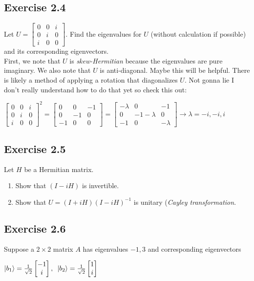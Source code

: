 \documentclass[12pt]{article}
\theoremstyle{plain}
\theoremstyle{nonumberplain}
\theoremstyle{plain}
\theoremstyle{nonumberplain}
\newcommand\1{{\bf 1}}
\newcommand{\bmat}[1]{\begin{bmatrix*} #1 \end{bmatrix*}} %
\newcommand{\<}{\left\langle}
\renewcommand{\>}{\right\rangle}
\begin{document}
\subsection{Exercise 2.4}
Let $U=\bmat{0 & 0 & i \\ 0 & i & 0 \\ i & 0 & 0}$. Find the eigenvalues for $U$ (without calculation if possible) and its corresponding eigenvectors. \\
First, we note that $U$ is \textit{skew-Hermitian} because the eigenvalues are pure imaginary. We also note that $U$ is anti-diagonal. Maybe this will be helpful. There is likely a method of applying a rotation that diagonalizes $U$. Not gonna lie I don't really understand how to do that yet so check this out:
\begin{center}
$\bmat{0 & 0 & i \\ 0 & i & 0 \\ i & 0 & 0}^2=\bmat{0 & 0 & -1 \\ 0 & -1 & 0 \\ -1 & 0 & 0}=
\bmat{-\lambda & 0 & -1 \\ 0 & -1-\lambda & 0 \\ -1 & 0 & -\lambda}\longrightarrow\lambda=-i,-i,i$
\end{center}


\subsection{Exercise 2.5}
Let $H$ be a Hermitian matrix.
\begin{enumerate}[label=(\alph*)]
\item Show that $(I-iH)$ is invertible.
\item Show that $U=(I+iH)(I-iH)^{-1}$ is unitary (\textit{Cayley transformation}.
\end{enumerate}


\subsection{Exercise 2.6}
Suppose a $2\times 2$ matrix $A$ has eigenvalues $-1,3$ and corresponding eigenvectors
\begin{center}
$\ket{b_1}=\frac{1}{\sqrt{2}}\bmat{-1 \\ i},\text{ }\ket{b_2}=\frac{1}{\sqrt{2}}\bmat{1 \\ i}$
\end{center}
\end{document}
